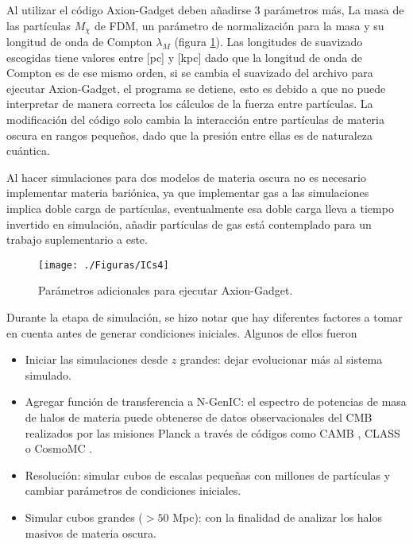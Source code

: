 \documentclass[a4paper,openright,12pt]{book}
\begin{document}
Al utilizar el código Axion-Gadget deben añadirse 3 parámetros más, La masa de las partículas $M_{\chi}$ de FDM, un parámetro de normalización para la masa y su longitud de onda de Compton $\lambda_{M}$ (figura \ref{fig 4.2}). Las longitudes de suavizado escogidas tiene valores entre [pc] y [kpc] dado que la longitud de onda de Compton es de ese mismo orden, si se cambia el suavizado del archivo para ejecutar Axion-Gadget, el programa se detiene, esto es debido a que no puede interpretar de manera correcta los cálculos de la fuerza entre partículas. La modificación del código solo cambia la interacción entre partículas de materia oscura en rangos pequeños, dado que la presión entre ellas es de naturaleza cuántica.

Al hacer simulaciones para dos modelos de materia oscura no es necesario implementar materia bariónica, ya que implementar gas a las simulaciones implica doble carga de partículas, eventualmente esa doble carga lleva a tiempo invertido en simulación, añadir partículas de gas está contemplado para un trabajo suplementario a este.

\begin{figure}
\centering \texttt{[image: ./Figuras/ICs4]}
\caption{\footnotesize{Parámetros adicionales para ejecutar Axion-Gadget.}}
\label{fig 4.2}
\end{figure}




Durante la etapa de simulación, se hizo notar que hay diferentes factores a tomar en cuenta antes de generar condiciones iniciales. Algunos de ellos fueron
\begin{itemize}
\item Iniciar las simulaciones desde $z$ grandes: dejar evolucionar más al sistema simulado.
\item Agregar función de transferencia a N-GenIC: el espectro de potencias de masa de halos de materia puede obtenerse de datos observacionales del CMB realizados por las misiones Planck a través de códigos como CAMB \cite{4.3.1}, CLASS \cite{4.3.1.2} o CosmoMC \cite{4.3.2}.
\item Resolución: simular cubos de escalas pequeñas con millones de partículas y cambiar parámetros de condiciones iniciales.
\item Simular cubos grandes ($> 50 $ Mpc): con la finalidad de analizar los halos masivos de materia oscura.
\end{itemize}
\end{document}
